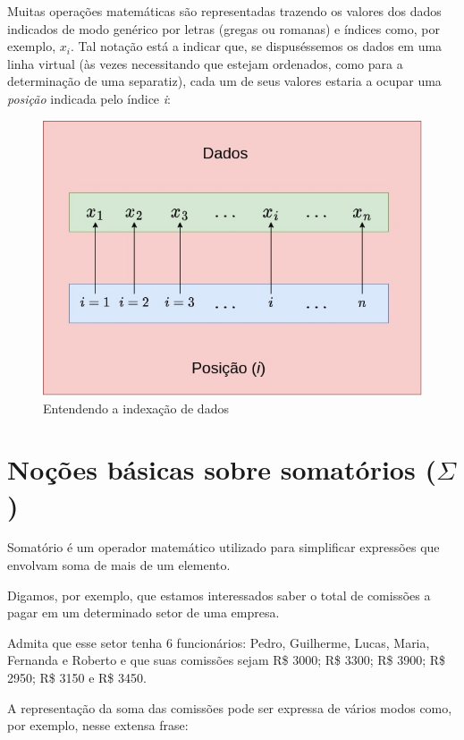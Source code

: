 \documentclass[
]{book}
\begin{document}
Muitas operações matemáticas são representadas trazendo os valores dos dados indicados de modo genérico por letras (gregas ou romanas) e índices como, por exemplo, \(x_{i}\). Tal notação está a indicar que, se dispuséssemos os dados em uma linha virtual (às vezes necessitando que estejam ordenados, como para a determinação de uma separatiz), cada um de seus valores estaria a ocupar uma \emph{posição} indicada pelo índice \emph{i}:

\hfill\break

\begin{figure}

{\centering \includegraphics[width=0.6\linewidth]{images2/vetor_posicao} 

}

\caption{Entendendo a indexação de dados}\label{fig:unnamed-chunk-8}
\end{figure}

\hypertarget{nouxe7uxf5es-buxe1sicas-sobre-somatuxf3rios-sigma}{%
\section{\texorpdfstring{Noções básicas sobre somatórios (\(\Sigma\))}{Noções básicas sobre somatórios (\textbackslash Sigma)}}\label{nouxe7uxf5es-buxe1sicas-sobre-somatuxf3rios-sigma}}

Somatório é um operador matemático utilizado para simplificar expressões que envolvam soma de mais de um elemento.

Digamos, por exemplo, que estamos interessados saber o total de comissões a pagar em um determinado setor de uma empresa.

Admita que esse setor tenha 6 funcionários: Pedro, Guilherme, Lucas, Maria, Fernanda e Roberto e que suas comissões sejam R\$ 3000; R\$ 3300; R\$ 3900; R\$ 2950; R\$ 3150 e R\$ 3450.

A representação da soma das comissões pode ser expressa de vários modos como, por exemplo, nesse extensa frase:
\end{document}
